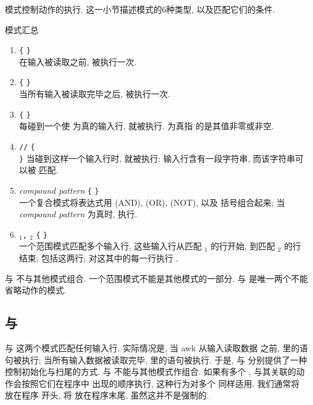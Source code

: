 模式控制动作的执行. 这一小节描述模式的6种类型, 以及匹配它们的条件.
\begin{summary}{模式汇总}
    \begin{enumerate}
        \item \BEGIN \verb'{' \stmt \verb'}' \\
            在输入被读取之前, \stmt 被执行一次.
        \item \END \verb'{' \stmt \verb'}'      \\
            当所有输入被读取完毕之后, \stmt 被执行一次.
        \item \expr \verb'{' \stmt \verb'}' \\
            每碰到一个使 \expr 为真的输入行, \stmt 就被执行. \expr 为真指
            的是其值非零或非空.
        \item \verb'/'\regexpr\verb'/' \verb'{' \\
            \stmt \verb'}'
            当碰到这样一个输入行时, \stmt 就被执行: 输入行含有一段字符串,
            而该字符串可以被 \regexpr 匹配.
        \item \textit{compound pattern} \verb'{' \stmt \verb'}' \\
            一个复合模式将表达式用 \AND{}(AND), \OR{}(OR), \NOT{}(NOT), 以及
            括号组合起来; 当 \textit{compound pattern} 为真时, \stmt 执行.
        \item \pat$_1$\verb',' \pat$_2$ \verb'{' \stmt{}\verb'}' \\
            一个范围模式匹配多个输入行, 这些输入行从匹配 \pat$_1$ 的行开始,
            到匹配 \pat$_2$ 的行结束, 包括这两行; 对这其中的每一行执行
            \stmt.
    \end{enumerate}
    \BEGIN 与 \END 不与其他模式组合. 一个范围模式不能是其他模式的一部分.
    \BEGIN 与 \END 是唯一两个不能省略动作的模式.
\end{summary}

\subsection{\BEGIN 与 \END}
\label{subsec:begin_and_end}

\BEGIN 与 \END 这两个模式匹配任何输入行. 实际情况是, 当 awk 从输入读取数据
之前, \BEGIN 里的语句被执行; 当所有输入数据被读取完毕, \END 里的语句被执行.
于是, \BEGIN 与 \END 分别提供了一种控制初始化与扫尾的方式. \BEGIN 与 \END
不能与其他模式作组合. 如果有多个 \BEGIN, 与其关联的动作会按照它们在程序中
出现的顺序执行, 这种行为对多个 \END 同样适用. 我们通常将 \BEGIN 放在程序
开头, 将 \END 放在程序末尾, 虽然这并不是强制的.

